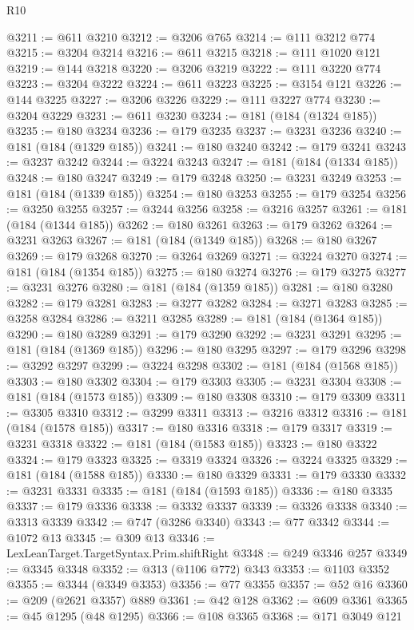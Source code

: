 \begin{lexlean}{R10}
\begin{coremodule}
@3211 := @611 @3210
@3212 := @3206 @765
@3214 := @111 @3212 @774
@3215 := @3204 @3214
@3216 := @611 @3215
@3218 := @111 @1020 @121
@3219 := @144 @3218
@3220 := @3206 @3219
@3222 := @111 @3220 @774
@3223 := @3204 @3222
@3224 := @611 @3223
@3225 := @3154 @121
@3226 := @144 @3225
@3227 := @3206 @3226
@3229 := @111 @3227 @774
@3230 := @3204 @3229
@3231 := @611 @3230
@3234 := @181 (@184 (@1324 @185))
@3235 := @180 @3234
@3236 := @179 @3235
@3237 := @3231 @3236
@3240 := @181 (@184 (@1329 @185))
@3241 := @180 @3240
@3242 := @179 @3241
@3243 := @3237 @3242
@3244 := @3224 @3243
@3247 := @181 (@184 (@1334 @185))
@3248 := @180 @3247
@3249 := @179 @3248
@3250 := @3231 @3249
@3253 := @181 (@184 (@1339 @185))
@3254 := @180 @3253
@3255 := @179 @3254
@3256 := @3250 @3255
@3257 := @3244 @3256
@3258 := @3216 @3257
@3261 := @181 (@184 (@1344 @185))
@3262 := @180 @3261
@3263 := @179 @3262
@3264 := @3231 @3263
@3267 := @181 (@184 (@1349 @185))
@3268 := @180 @3267
@3269 := @179 @3268
@3270 := @3264 @3269
@3271 := @3224 @3270
@3274 := @181 (@184 (@1354 @185))
@3275 := @180 @3274
@3276 := @179 @3275
@3277 := @3231 @3276
@3280 := @181 (@184 (@1359 @185))
@3281 := @180 @3280
@3282 := @179 @3281
@3283 := @3277 @3282
@3284 := @3271 @3283
@3285 := @3258 @3284
@3286 := @3211 @3285
@3289 := @181 (@184 (@1364 @185))
@3290 := @180 @3289
@3291 := @179 @3290
@3292 := @3231 @3291
@3295 := @181 (@184 (@1369 @185))
@3296 := @180 @3295
@3297 := @179 @3296
@3298 := @3292 @3297
@3299 := @3224 @3298
@3302 := @181 (@184 (@1568 @185))
@3303 := @180 @3302
@3304 := @179 @3303
@3305 := @3231 @3304
@3308 := @181 (@184 (@1573 @185))
@3309 := @180 @3308
@3310 := @179 @3309
@3311 := @3305 @3310
@3312 := @3299 @3311
@3313 := @3216 @3312
@3316 := @181 (@184 (@1578 @185))
@3317 := @180 @3316
@3318 := @179 @3317
@3319 := @3231 @3318
@3322 := @181 (@184 (@1583 @185))
@3323 := @180 @3322
@3324 := @179 @3323
@3325 := @3319 @3324
@3326 := @3224 @3325
@3329 := @181 (@184 (@1588 @185))
@3330 := @180 @3329
@3331 := @179 @3330
@3332 := @3231 @3331
@3335 := @181 (@184 (@1593 @185))
@3336 := @180 @3335
@3337 := @179 @3336
@3338 := @3332 @3337
@3339 := @3326 @3338
@3340 := @3313 @3339
@3342 := @747 (@3286 @3340)
@3343 := @77 @3342
@3344 := @1072 @13
@3345 := @309 @13
@3346 := LexLeanTarget.TargetSyntax.Prim.shiftRight
@3348 := @249 @3346 @257
@3349 := @3345 @3348
@3352 := @313 (@1106 @772) @343
@3353 := @1103 @3352
@3355 := @3344 (@3349 @3353)
@3356 := @77 @3355
@3357 := @52 @16
@3360 := @209 (@2621 @3357) @889
@3361 := @42 @128
@3362 := @609 @3361
@3365 := @45 @1295 (@48 @1295)
@3366 := @108 @3365
@3368 := @171 @3049 @121

\end{coremodule}
\end{lexlean}
